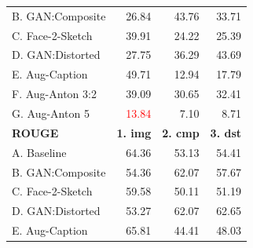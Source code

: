 \documentclass[aspectratio=1610]{beamer} %
\begin{document}
\begin{frame}
\begin{table}[htbp]
{\begin{tabular}{|l|rrr|}
B. GAN:Composite        & 26.84                                                    & 43.76                                               & 33.71                                                      \\
C. Face-2-Sketch       & 39.91                                                & 24.22                                                     & 25.39                                                      \\
D. GAN:Distorted         & 27.75                                                    & 36.29                                                     & 43.69
\\
\hdashline
E. Aug-Caption             & 49.71                                                  & 12.94                                                     & 17.79                                                      \\
F. Aug-Anton 3:2 & 39.09                                                    & 30.65                                                & 32.41                                                 \\
G. Aug-Anton 5   & \textcolor{red}{13.84}                                                    & 7.10                                                      & 8.71                                                       \\
\hline
\hline
\textbf{ROUGE} & \textbf{1. img} & \textbf{2. cmp} & \textbf{3. dst} \\ 
\hline
A. Baseline          & 64.36                                                  & 53.13                                                     & 54.41                                                      \\
B. GAN:Composite        & 54.36                                                    & 62.07                                                & 57.67                                                      \\
C. Face-2-Sketch       & 59.58                                                & 50.11                                                     & 51.19                                                      \\
D. GAN:Distorted         & 53.27                                                    & 62.07                                                     & 62.65                                                   \\
\hdashline
E. Aug-Caption             & 65.81                                               & 44.41                                                     & 48.03                                                      \\

\end{tabular}}
\end{table}
\end{frame}
\end{document}
